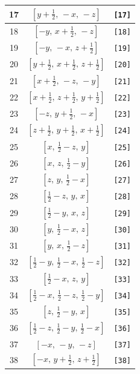 \documentclass[fleqn,8pt]{jsarticle}
\begin{document}
\begin{longtable}{ccc}
17 & $\left[ y + \frac{1}{2},\, - x,\, - z \right]$ & {\tt [17]} \\ \hline
18 & $\left[ - y,\, x + \frac{1}{2},\, - z \right]$ & {\tt [18]} \\ \hline
19 & $\left[ - y,\, - x,\, z + \frac{1}{2} \right]$ & {\tt [19]} \\ \hline
20 & $\left[ y + \frac{1}{2},\, x + \frac{1}{2},\, z + \frac{1}{2} \right]$ & {\tt [20]} \\ \hline
21 & $\left[ x + \frac{1}{2},\, - z,\, - y \right]$ & {\tt [21]} \\ \hline
22 & $\left[ x + \frac{1}{2},\, z + \frac{1}{2},\, y + \frac{1}{2} \right]$ & {\tt [22]} \\ \hline
23 & $\left[ - z,\, y + \frac{1}{2},\, - x \right]$ & {\tt [23]} \\ \hline
24 & $\left[ z + \frac{1}{2},\, y + \frac{1}{2},\, x + \frac{1}{2} \right]$ & {\tt [24]} \\ \hline
25 & $\left[ x,\, \frac{1}{2} - z,\, y \right]$ & {\tt [25]} \\ \hline
26 & $\left[ x,\, z,\, \frac{1}{2} - y \right]$ & {\tt [26]} \\ \hline
27 & $\left[ z,\, y,\, \frac{1}{2} - x \right]$ & {\tt [27]} \\ \hline
28 & $\left[ \frac{1}{2} - z,\, y,\, x \right]$ & {\tt [28]} \\ \hline
29 & $\left[ \frac{1}{2} - y,\, x,\, z \right]$ & {\tt [29]} \\ \hline
30 & $\left[ y,\, \frac{1}{2} - x,\, z \right]$ & {\tt [30]} \\ \hline
31 & $\left[ y,\, x,\, \frac{1}{2} - z \right]$ & {\tt [31]} \\ \hline
32 & $\left[ \frac{1}{2} - y,\, \frac{1}{2} - x,\, \frac{1}{2} - z \right]$ & {\tt [32]} \\ \hline
33 & $\left[ \frac{1}{2} - x,\, z,\, y \right]$ & {\tt [33]} \\ \hline
34 & $\left[ \frac{1}{2} - x,\, \frac{1}{2} - z,\, \frac{1}{2} - y \right]$ & {\tt [34]} \\ \hline
35 & $\left[ z,\, \frac{1}{2} - y,\, x \right]$ & {\tt [35]} \\ \hline
36 & $\left[ \frac{1}{2} - z,\, \frac{1}{2} - y,\, \frac{1}{2} - x \right]$ & {\tt [36]} \\ \hline
37 & $\left[ - x,\, - y,\, - z \right]$ & {\tt [37]} \\ \hline
38 & $\left[ - x,\, y + \frac{1}{2},\, z + \frac{1}{2} \right]$ & {\tt [38]} \\ \hline

\end{longtable}
\end{document}
